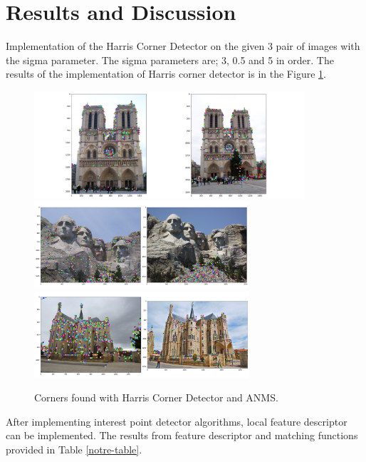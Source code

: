 \documentclass[a4paper]{article}
\begin{document}
\section{Results and Discussion}


Implementation of the Harris Corner Detector on the given 3 pair of images with the sigma parameter. The sigma parameters are; 3, 0.5 and 5 in order. The results of the implementation of Harris corner detector is in the Figure \ref{notre-harris}.

\begin{figure}[!htbp]
\begin{center}
\includegraphics[width=10cm]{notre_dame_harris.png}
\includegraphics[width=8cm]{mt_rushmore_harris.png}
\includegraphics[width=8cm]{eg_harris.png}
\end{center}
\caption{Corners found with Harris Corner Detector and ANMS.}
\label{notre-harris}
\end{figure}


After implementing interest point detector algorithms, local feature descriptor can be implemented. The results from feature descriptor and matching functions provided in Table \ref{notre-table}.
\end{document}
